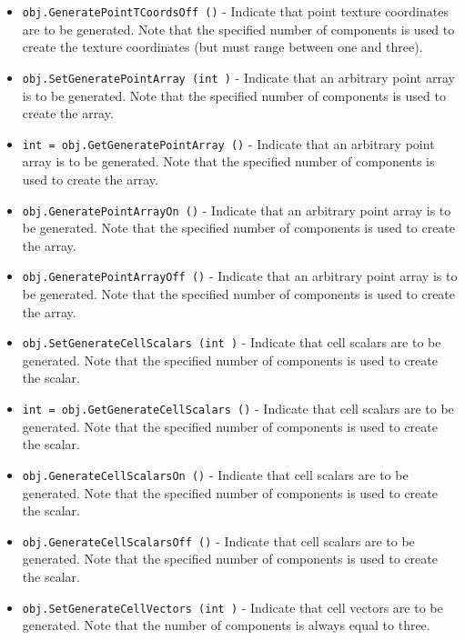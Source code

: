 \begin{itemize}
\item  \verb|obj.GeneratePointTCoordsOff ()| -  Indicate that point texture coordinates are to be generated. Note that
 the specified number of components is used to create the texture
 coordinates (but must range between one and three).

\item  \verb|obj.SetGeneratePointArray (int )| -  Indicate that an arbitrary point array is to be generated. Note that the
 specified number of components is used to create the array.

\item  \verb|int = obj.GetGeneratePointArray ()| -  Indicate that an arbitrary point array is to be generated. Note that the
 specified number of components is used to create the array.

\item  \verb|obj.GeneratePointArrayOn ()| -  Indicate that an arbitrary point array is to be generated. Note that the
 specified number of components is used to create the array.

\item  \verb|obj.GeneratePointArrayOff ()| -  Indicate that an arbitrary point array is to be generated. Note that the
 specified number of components is used to create the array.

\item  \verb|obj.SetGenerateCellScalars (int )| -  Indicate that cell scalars are to be generated. Note that the specified
 number of components is used to create the scalar.

\item  \verb|int = obj.GetGenerateCellScalars ()| -  Indicate that cell scalars are to be generated. Note that the specified
 number of components is used to create the scalar.

\item  \verb|obj.GenerateCellScalarsOn ()| -  Indicate that cell scalars are to be generated. Note that the specified
 number of components is used to create the scalar.

\item  \verb|obj.GenerateCellScalarsOff ()| -  Indicate that cell scalars are to be generated. Note that the specified
 number of components is used to create the scalar.

\item  \verb|obj.SetGenerateCellVectors (int )| -  Indicate that cell vectors are to be generated. Note that the 
 number of components is always equal to three.


\end{itemize}
